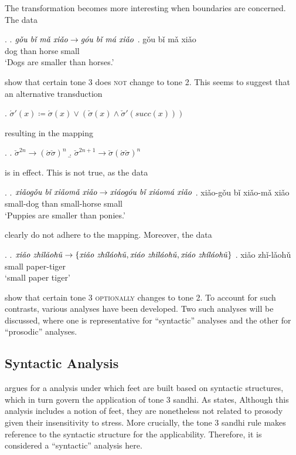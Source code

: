 \documentclass[12pt, a4paper]{report}
\newcommand{\textemph}[1]{\textsc{#1}}
\newcommand{\textform}[1]{\textit{#1}}
\newcommand{\textgls}[1]{`#1'}
\begin{document}
The transformation becomes more interesting when boundaries are
concerned.  The data

\ex.
\a. \(\text{\textform{gǒu bǐ mǎ xiǎo}} \to
\text{\textform{góu bǐ má xiǎo}}\)
\bg. gǒu bǐ mǎ xiǎo\\
dog than horse small\\
\trans\textgls{Dogs are smaller than horses.}

show that certain tone 3 does \textemph{not} change to tone 2.  This
seems to suggest that an alternative transduction

\ex. \(\acute{\sigma}'(x) \coloneq \acute{\sigma}(x) \lor
(\check{\sigma}(x) \land \check{\sigma}'(\mathit{succ}(x)))\)

resulting in the mapping

\ex.
\a. \(\check{\sigma}^{2n} \to (\acute{\sigma}\check{\sigma})^{n}\)
\b. \(\check{\sigma}^{2n+1} \to
\check{\sigma} (\acute{\sigma}\check{\sigma})^{n}\)

is in effect.  This is not true, as the data

\ex.
\a. \(\text{\textform{xiǎogǒu bǐ xiǎomǎ xiǎo}} \to
\text{\textform{xiáogóu bǐ xiáomá xiǎo}}\)
\bg. xiǎo-gǒu bǐ xiǎo-mǎ xiǎo\\
small-dog than small-horse small\\
\trans\textgls{Puppies are smaller than ponies.}

clearly do not adhere to the mapping.  Moreover, the data

\ex.
\a. \(\text{\textform{xiǎo zhǐlǎohǔ}} \to
\{\text{\textform{xiǎo zhíláohǔ}},
\text{\textform{xiáo zhǐláohǔ}},
\text{\textform{xiáo zhíláohǔ}}\}\)
\bg. xiǎo zhǐ-lǎohǔ\\
small paper-tiger\\
\trans\textgls{small paper tiger}

show that certain tone 3 \textemph{optionally} changes to tone 2.  To
account for such contrasts, various analyses have been developed.  Two
such analyses will be discussed, where one is representative for
\enquote{syntactic} analyses and the other for \enquote{prosodic}
analyses.

\subsection{Syntactic Analysis}
\textcite{c00tspcd} argues for a analysis under which feet are built
based on syntactic structures, which in turn govern the application of
tone 3 sandhi.  As \textcite{d07psc} states, Although this analysis
includes a notion of feet, they are nonetheless not related to prosody
given their insensitivity to stress.  More crucially, the tone 3
sandhi rule makes reference to the syntactic structure for the
applicability.  Therefore, it is considered a \enquote{syntactic}
analysis here.
\end{document}

